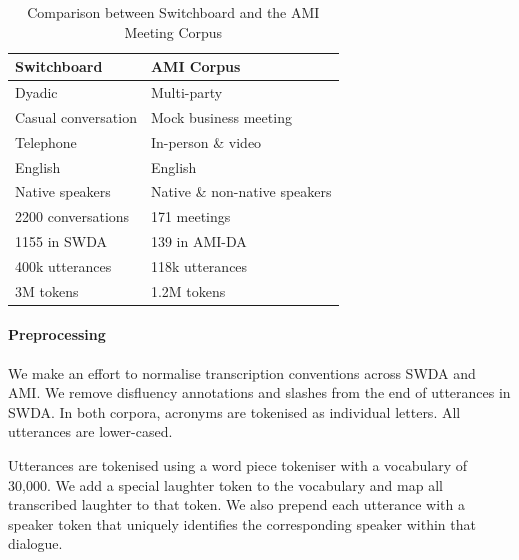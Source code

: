 \documentclass[11pt,a4paper]{article}
\begin{document}

\begin{table}[ht]
\small
\centering
\begin{tabular}{@{}ll@{}}
\textbf{Switchboard}       & \textbf{AMI Corpus}                     \\\hline
Dyadic                     & Multi-party                             \\
Casual conversation        & Mock business meeting                   \\
Telephone                  & In-person \& video                      \\
English                    & English                                 \\ 
Native speakers            & Native \& non-native speakers           \\ 
2200 conversations         & 171 meetings                            \\
  \hspace{1em} 1155 in SWDA               & \hspace{1em} 139 in AMI-DA                           \\
400k utterances             & 118k utterances                         \\
  3M tokens                  & 1.2M tokens                             \\
\end{tabular}  
\caption{Comparison between Switchboard and the AMI Meeting Corpus
  \label{table:corpora}}
\end{table}

\paragraph{Preprocessing}

We make an effort to normalise transcription conventions across SWDA and AMI.
We remove disfluency annotations and slashes from the end of utterances in SWDA.
In both corpora, acronyms are tokenised as individual letters. 
All utterances are lower-cased.

Utterances are tokenised using a word piece tokeniser \citep{Wu2016} with a vocabulary of 30,000.
We add a special laughter token to the vocabulary and map all transcribed laughter to that token.
We also  prepend each utterance with a speaker token that uniquely identifies the corresponding speaker within that dialogue.
\end{document}
